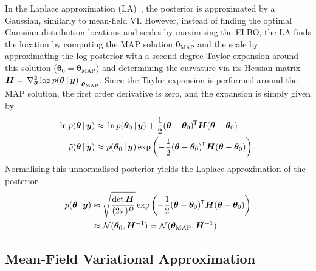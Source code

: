 In the Laplace approximation (LA)~\cite{daxberger2021laplace}, the posterior is approximated by a Gaussian, similarly to mean-field VI.
However, instead of finding the optimal Gaussian distribution locations and scales by maximising the ELBO, the LA finds the location by computing the MAP solution \(\bm \theta_{\text{MAP}}\) and the scale by approximating the log posterior with a second degree Taylor expansion around this solution (\(\bm \theta_0 = \bm \theta_{\text{MAP}}\)) and determining the curvature via its Hessian matrix \(\bm H = \left.\nabla^2_{\bm \theta} \log p(\bm \theta \, | \, \bm y) \right|_{\bm \theta_\mathrm{MAP}}\).
Since the Taylor expansion is performed around the MAP solution, the first order derivative is zero, and the expansion is simply given by
\begin{align}
    \ln p(\bm \theta \, | \, \bm y) \approx{}     & \ln p(\bm \theta_0 \, | \, \bm y)        + \frac{1}{2} (\bm \theta - \bm \theta_0)^{\mkern-1.5mu\mathsf{T}} \bm H (\bm \theta - \bm \theta_0)                        \label{eq:laplace-taylor} \\
    \tilde{p}(\bm \theta \, | \, \bm y) \approx{} & p(\bm \theta_0 \, | \, \bm y) \exp\left(-\frac{1}{2} (\bm \theta - \bm \theta_0)^{\mkern-1.5mu\mathsf{T}} \bm H (\bm \theta - \bm \theta_0)\right).\nonumber
\end{align}
Normalising this unnormalised posterior yields the Laplace approximation of the posterior
\begin{align}
    p(\bm\theta \, | \, \bm y) \approx{} & \sqrt{\frac{\det\bm H}{(2 \pi)^D}} \exp\left(-\frac{1}{2} (\bm \theta - \bm \theta_0)^{\mkern-1.5mu\mathsf{T}} \bm H (\bm \theta - \bm \theta_0)\right) \nonumber \\
    \approx{}                           & \mathcal{N}(\bm \theta_0, \bm H^{-1}) = \mathcal{N}(\bm \theta_{\text{MAP}}, \bm H^{-1}).\label{eq:laplace}
\end{align}

\subsection{Mean-Field Variational Approximation}\label{ssec:mfvi}

